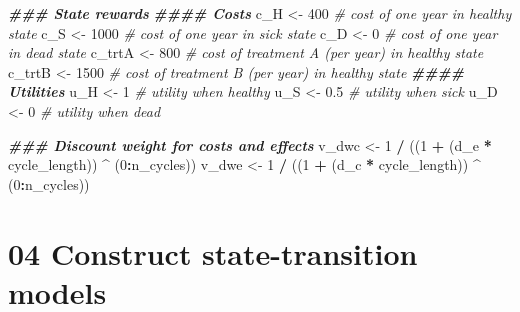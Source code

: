 \documentclass[
]{article}
\newenvironment{Shaded}{\begin{snugshade}}{\end{snugshade}}
\newcommand{\CommentTok}[1]{\textcolor[rgb]{0.56,0.35,0.01}{\textit{#1}}}
\newcommand{\DecValTok}[1]{\textcolor[rgb]{0.00,0.00,0.81}{#1}}
\newcommand{\DocumentationTok}[1]{\textcolor[rgb]{0.56,0.35,0.01}{\textbf{\textit{#1}}}}
\newcommand{\FloatTok}[1]{\textcolor[rgb]{0.00,0.00,0.81}{#1}}
\newcommand{\NormalTok}[1]{#1}
\newcommand{\OtherTok}[1]{\textcolor[rgb]{0.56,0.35,0.01}{#1}}
\newcommand{\SpecialCharTok}[1]{\textcolor[rgb]{0.81,0.36,0.00}{\textbf{#1}}}
\begin{document}
\begin{Shaded}
\begin{Highlighting}[]
\DocumentationTok{\#\#\# State rewards}
\DocumentationTok{\#\#\#\# Costs }
\NormalTok{c\_H       }\OtherTok{\textless{}{-}} \DecValTok{400}   \CommentTok{\# cost of one year in healthy state}
\NormalTok{c\_S       }\OtherTok{\textless{}{-}} \DecValTok{1000}  \CommentTok{\# cost of one year in sick state}
\NormalTok{c\_D       }\OtherTok{\textless{}{-}} \DecValTok{0}     \CommentTok{\# cost of one year in dead state}
\NormalTok{c\_trtA    }\OtherTok{\textless{}{-}} \DecValTok{800}   \CommentTok{\# cost of treatment A (per year) in healthy state}
\NormalTok{c\_trtB    }\OtherTok{\textless{}{-}} \DecValTok{1500}  \CommentTok{\# cost of treatment B (per year) in healthy state}
\DocumentationTok{\#\#\#\# Utilities}
\NormalTok{u\_H       }\OtherTok{\textless{}{-}} \DecValTok{1}     \CommentTok{\# utility when healthy }
\NormalTok{u\_S       }\OtherTok{\textless{}{-}} \FloatTok{0.5}   \CommentTok{\# utility when sick}
\NormalTok{u\_D       }\OtherTok{\textless{}{-}} \DecValTok{0}     \CommentTok{\# utility when dead}

\DocumentationTok{\#\#\# Discount weight for costs and effects }
\NormalTok{v\_dwc     }\OtherTok{\textless{}{-}} \DecValTok{1} \SpecialCharTok{/}\NormalTok{ ((}\DecValTok{1} \SpecialCharTok{+}\NormalTok{ (d\_e }\SpecialCharTok{*}\NormalTok{ cycle\_length)) }\SpecialCharTok{\^{}}\NormalTok{ (}\DecValTok{0}\SpecialCharTok{:}\NormalTok{n\_cycles))}
\NormalTok{v\_dwe     }\OtherTok{\textless{}{-}} \DecValTok{1} \SpecialCharTok{/}\NormalTok{ ((}\DecValTok{1} \SpecialCharTok{+}\NormalTok{ (d\_c }\SpecialCharTok{*}\NormalTok{ cycle\_length)) }\SpecialCharTok{\^{}}\NormalTok{ (}\DecValTok{0}\SpecialCharTok{:}\NormalTok{n\_cycles))}
\end{Highlighting}
\end{Shaded}

\hypertarget{construct-state-transition-models}{%
\section{04 Construct state-transition
models}\label{construct-state-transition-models}}
\end{document}
